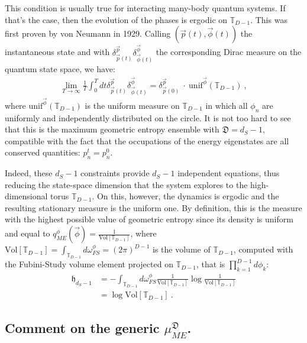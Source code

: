 \documentclass[draft,nofootinbib,pre,twocolumn,showpacs,showkeys,groupaddress,preprintnumbers,floatfix]{revtex4-1}
\newcommand{\1}{\mathbbm{1}}
\newcommand{\ID}{\mathfrak{D}}
\begin{document}
This condition is usually true for 
interacting many-body quantum systems. If that's the case, then the evolution of the phases is ergodic on $\mathbb{T}_{D-1}$.
This was first proven by von Neumann \cite{vNeu29} in 1929. Calling $(\vec{p}(t),\vec{\phi}(t))$ the instantaneous state 
and with $\delta^{\vec{p}}_{\vec{p}(t)} \delta^{\vec{\phi}}_{\vec{\phi}(t)}$
the corresponding Dirac measure on the quantum state space, we have:
\begin{align*}
\lim_{T \to \infty} \frac{1}{T}\int_0^T dt \delta^{\vec{p}}_{\vec{p}(t)} \delta^{\vec{\phi}}_{\vec{\phi}(t)} = \delta^{\vec{p}}_{\vec{p}(0)}~\cdot~\mathrm{unif}^{\vec{\phi}}\left(\mathbb{T}_{D-1}\right)
  ~,
\end{align*}
where $\mathrm{unif}^{\vec{\phi}}\left(\mathbb{T}_{D-1}\right)$ is the uniform
measure on $\mathbb{T}_{D-1}$ in which all $\phi_n$ are uniformly and
independently distributed on the circle. It is not too hard to see that this is
the maximum geometric entropy ensemble with $\ID = d_S-1$, compatible with the
fact that the occupations of the energy eigenstates are all conserved
quantities: $p_n^t = p_n^0$.

Indeed, these $d_S-1$ constraints provide $d_S-1$ independent equations, thus
reducing the state-space dimension that the system explores to the
high-dimensional torus $\mathbb{T}_{D-1}$. On this, however, the dynamics is
ergodic and the resulting stationary measure is the uniform one. By definition,
this is the measure with the highest possible value of geometric entropy since
its density is uniform and equal to $q_{ME}^{\phi}(\vec{\phi}) =
\frac{1}{\mathrm{Vol}[\mathbb{T}_{D-1}]}$, where
$\mathrm{Vol}[\mathbb{T}_{D-1}] = \int_{\mathbb{T}_{D-1}}\!\!\!
d\omega_{FS}^{\phi} = (2\pi)^{D-1}$ is the volume of $\mathbb{T}_{D-1}$,
computed with the Fubini-Study volume element projected on $\mathbb{T}_{D-1}$, that is
$\prod_{k=1}^{D-1} d\phi_k$:
\begin{align*}
\mathfrak{h}_{d_S-1} &= - \int_{\mathbb{T}_{D-1}}\!\!\!d\omega_{FS}^{\phi} \frac{1}{\mathrm{Vol}[\mathbb{T}_{D-1}]} \log \frac{1}{\mathrm{Vol}[\mathbb{T}_{D-1}]}\nonumber \\
& = \log \mathrm{Vol}[\mathbb{T}_{D-1}]
  ~.
\end{align*}

\subsection*{Comment on the generic $\mu_{ME}^{\ID}$.}
\end{document}
